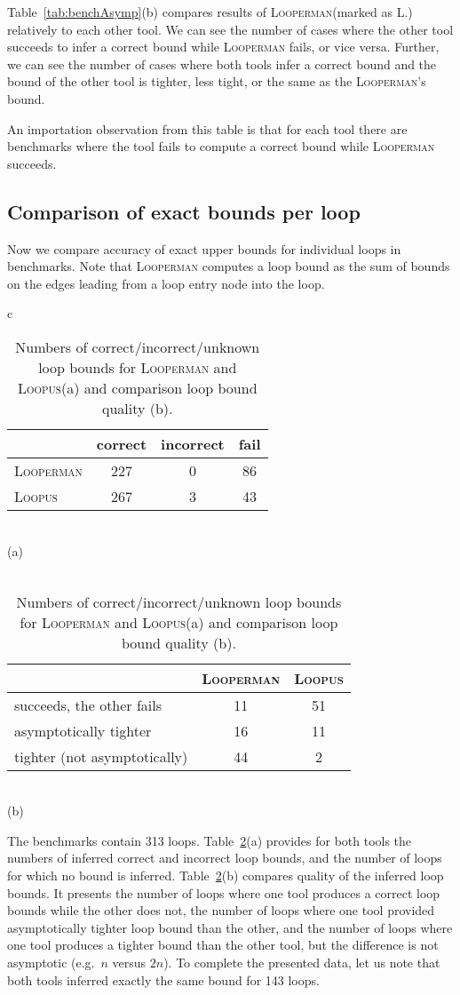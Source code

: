 \documentclass[10pt,a4paper]{article}
\newcommand{\Looperman}{\textsc{Looperman}\xspace}
\newcommand{\Loopus}{\textsc{Loopus}\xspace}
\begin{document}
Table~\ref{tab:benchAsymp}(b) compares results of \Looperman (marked as
\textsc{L.}) relatively to each other tool. We can see the number of cases
where the other tool succeeds to infer a correct bound while \Looperman
fails, or vice versa.  Further, we can see the number of cases where both
tools infer a correct bound and the bound of the other tool is tighter, less
tight, or the same as the \Looperman's bound.

An importation observation from this table is that for each tool there
are benchmarks where the tool fails to compute a correct bound while
\Looperman succeeds. 


\subsection{Comparison of exact bounds per loop}\label{sec:evalExact}

Now we compare accuracy of exact upper bounds for individual loops in
benchmarks. Note that \Looperman computes a loop bound as the sum of
bounds on the edges leading from a loop entry node into the loop.

\begin{table}[t]
\begin{center}
\begin{tabular}{c}
\begin{tabular}{l|ccc}
& correct & incorrect & fail \\
\hline
\Looperman & 227 & 0 & 86 \\
\Loopus & 267 & 3 & 43\\
\end{tabular}
\\
(a)
\\\\
\begin{tabular}{l|cc}
& \Looperman & \Loopus \\ \hline
succeeds, the other fails & 11 & 51 \\ 
asymptotically tighter & 16 & 11 \\
tighter (not asymptotically) & 44 & 2
\end{tabular}
\\
(b)
\end{tabular}
\end{center}
\caption{Numbers of correct/incorrect/unknown loop bounds for \Looperman and
  \Loopus (a) and comparison loop bound quality (b).}
\label{tab:benchLoops}
\end{table}

The benchmarks contain 313 loops. Table~\ref{tab:benchLoops}(a) provides for
both tools the numbers of inferred correct and incorrect loop bounds, and the
number of loops for which no bound is inferred.
Table~\ref{tab:benchLoops}(b) compares quality of the inferred loop
bounds.  It presents the number of loops where one tool produces a
correct loop bounds while the other does not, the number of loops
where one tool provided asymptotically tighter loop bound than the
other, and the number of loops where one tool produces a tighter bound
than the other tool, but the difference is not asymptotic (e.g.~$n$
versus $2n$). To complete the presented data, let us note that both
tools inferred exactly the same bound for 143 loops.
\end{document}
